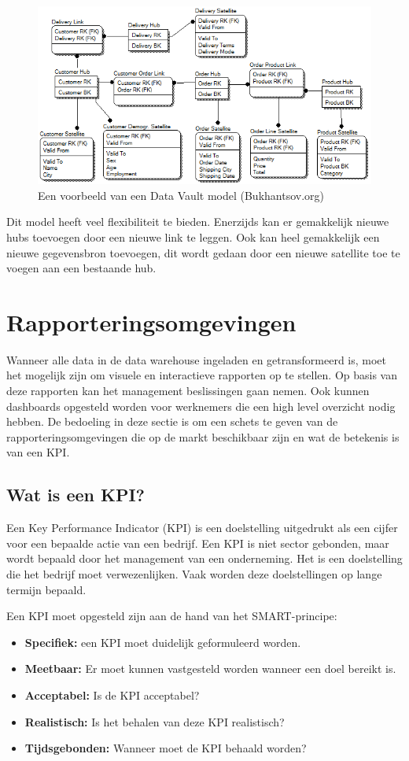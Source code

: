 \begin{figure}[h]
	\centering
	\includegraphics[scale=0.7]{../images/dvmodel.png}
	\caption{Een voorbeeld van een Data Vault model (Bukhantsov.org)}
	\label{fig:dvmod}
\end{figure}

Dit model heeft veel flexibiliteit te bieden. Enerzijds kan er gemakkelijk nieuwe hubs toevoegen door een nieuwe link te leggen. Ook kan heel gemakkelijk een nieuwe gegevensbron toevoegen, dit wordt gedaan door een nieuwe satellite toe te voegen aan een bestaande hub. 

\section{Rapporteringsomgevingen}
\label{sec:omgeving}
Wanneer alle data in de data warehouse ingeladen en getransformeerd is, moet het mogelijk zijn om visuele en interactieve rapporten op te stellen. Op basis van deze rapporten kan het management beslissingen gaan nemen. Ook kunnen dashboards opgesteld worden voor werknemers die een high level overzicht nodig hebben. De bedoeling in deze sectie is om een schets te geven van de rapporteringsomgevingen die op de markt beschikbaar zijn en wat de betekenis is van een KPI. 

\subsection{Wat is een KPI?}
Een Key Performance Indicator (KPI) is een doelstelling uitgedrukt als een cijfer voor een bepaalde actie van een bedrijf. Een KPI is niet sector gebonden, maar wordt bepaald door het management van een onderneming. Het is een doelstelling die het bedrijf moet verwezenlijken. Vaak worden deze doelstellingen op lange termijn bepaald. 

Een KPI moet opgesteld zijn aan de hand van het SMART-principe:
\begin{itemize}
	\item \textbf{Specifiek: } een KPI moet duidelijk geformuleerd worden.
	\item \textbf{Meetbaar: } Er moet kunnen vastgesteld worden wanneer een doel bereikt is.
	\item \textbf{Acceptabel:} Is de KPI acceptabel?
	\item \textbf{Realistisch: } Is het behalen van deze KPI realistisch?
	\item \textbf{Tijdsgebonden: } Wanneer moet de KPI behaald worden?
\end{itemize} 

